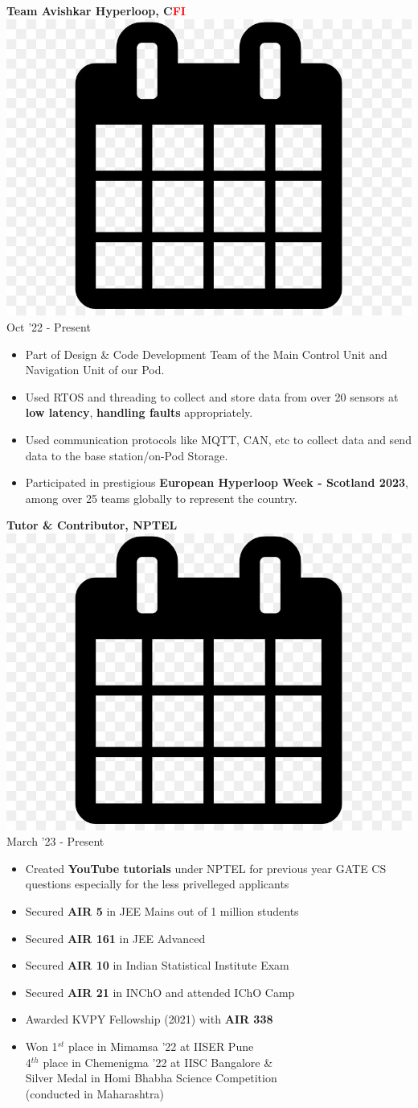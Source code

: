 \documentclass[10pt,article]{article}
\newcommand{\myMargin}{0.2in}
\newcommand{\resheading}[1]{{\small \colorbox{myblue} { \begin{minipage}{\dimexpr\linewidth-2\fboxsep}\centering{\textbf{#1 \vphantom{p\^{E}}}}\end{minipage}}}}
\newcommand{\myfont}[2]{\fontsize{#1}{#1}\selectfont #2}
\newcommand{\subheadingfont}[1]{\myfont{11pt}{#1}}
\newcommand{\projecttopic}[1]{\myfont{11pt}{\textbf{#1}}}
\newcommand{\mycal}[1]{\includegraphics[scale=0.02]{calendar.png} \myfont{10}{#1}}
\begin{document}
\begin{multicols*}{2}
\noindent
\projecttopic{Team Avishkar Hyperloop, C\textcolor{red}{FI}} \hfill \mycal{Oct '22 - Present} 
\begin{itemize}[noitemsep, nolistsep, leftmargin=\myMargin]
    \item Part of Design \& Code Development Team of the Main Control Unit and Navigation Unit of our Pod. 
    \item Used RTOS and threading to collect and store data from over 20 sensors at \textbf{low latency}, \textbf{handling faults} appropriately.
    \item Used communication protocols like MQTT, CAN, etc to collect data and send data to the base station/on-Pod Storage.
    \item Participated in prestigious \textbf{European Hyperloop Week - Scotland 2023}, 
    among over 25 teams globally to represent the country.
\end{itemize}
\projecttopic{Tutor \& Contributor, \textcolor{nptel}{NPTEL}} \hfill \mycal{March '23 - Present} 
\begin{itemize}[noitemsep, nolistsep, leftmargin=\myMargin]
    \item Created \textbf{YouTube tutorials} under NPTEL for previous year GATE CS questions especially for the less privelleged applicants
\end{itemize}


  

\columnbreak



\noindent
\resheading{\subheadingfont{SCHOLASTIC ACHIEVEMENTS}}
\begin{itemize}[leftmargin=\myMargin]
\item Secured \textbf{AIR 5} in JEE Mains out of 1 million students  %
\item Secured \textbf{AIR 161} in JEE Advanced \hfill
\item Secured \textbf{AIR 10} in Indian Statistical Institute Exam
\item Secured \textbf{AIR 21} in INChO and attended IChO Camp
\item Awarded KVPY Fellowship (2021) with \textbf{AIR 338}
\item Won 1$^{st}$ place in Mimamsa '22 at IISER Pune \\ 4$^{th}$ place in Chemenigma '22 at IISC Bangalore \& \\ Silver Medal in Homi Bhabha Science Competition \\ (conducted in Maharashtra)
\end{itemize} 


\end{multicols*}
\end{document}
